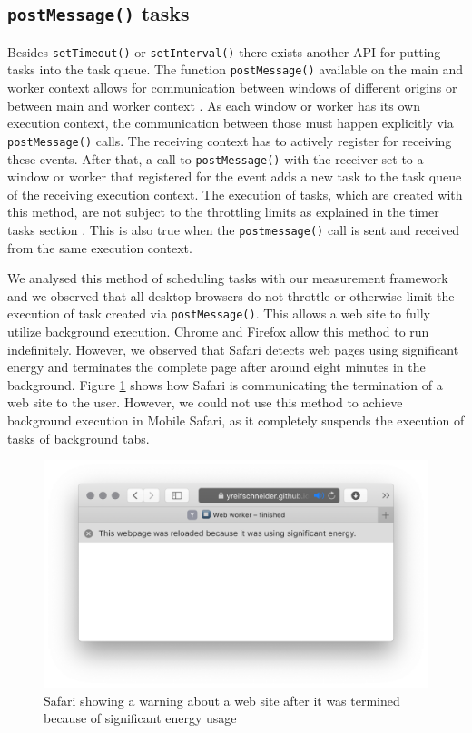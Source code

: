 \documentclass[
	ruledheaders=section,%
	class=report,%
	thesis={type=bachelor},%
	accentcolor=9c,%
	custommargins=true,%
	marginpar=false,%
	parskip=half-,%
	fontsize=11pt,%
]{tudapub}
\begin{document}
  \subsection{\texttt{postMessage()} tasks}

  Besides \texttt{setTimeout()} or \texttt{setInterval()} there exists another API for putting tasks into the task queue. The function \texttt{postMessage()} available on the main and worker context allows for communication between windows of different origins or between main and worker context \cite{mdn-postmessage}. As each window or worker has its own execution context, the communication between those must happen explicitly via \texttt{postMessage()} calls. The receiving context has to actively register for receiving these events. After that, a call to \texttt{postMessage()} with the receiver set to a window or worker that registered for the event adds a new task to the task queue of the receiving execution context. The execution of tasks, which are created with this method, are not subject to the throttling limits as explained in the timer tasks section \cite{zero-delay-timeouts}. This is also true when the \texttt{postmessage()} call is sent and received from the same execution context.

  We analysed this method of scheduling tasks with our measurement framework and we observed that all desktop browsers do not throttle or otherwise limit the execution of task created via \texttt{postMessage()}. This allows a web site to fully utilize background execution. Chrome and Firefox allow this method to run indefinitely. However, we observed that Safari detects web pages using significant energy and terminates the complete page after around eight minutes in the background. Figure \ref{fig:significant-energy} shows how Safari is communicating the termination of a web site to the user. However, we could not use this method to achieve background execution in Mobile Safari, as it completely suspends the execution of tasks of background tabs.

   \begin{figure}
      \includegraphics[width=\textwidth]{images/significant-energy.png}
    \caption{Safari showing a warning about a web site after it was termined because of significant energy usage}
    \label{fig:significant-energy}
  \end{figure}
\end{document}
